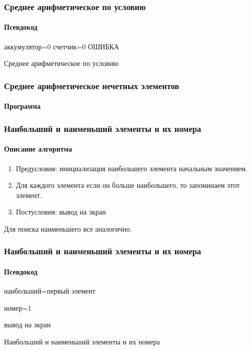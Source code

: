 \begin{frame}[fragile]
\frametitle{Среднее арифметическое по условию}
\framesubtitle{Псевдокод}
\small
\begin{algorithm}[H]
		\SetAlgoLined
		аккумулятор=0\;
		счетчик=0\;
	{ОШИБКА}
	
	\caption{Среднее арифметическое по условию}
\end{algorithm}


\end{frame}


\begin{frame}[fragile]
\frametitle{Среднее арифметическое нечетных элементов}
\framesubtitle{Программа}



\end{frame}


\begin{frame}[fragile]
\frametitle{Наибольший и наименьший элементы и их номера}
\framesubtitle{Описание алгоритма}
\begin{enumerate}
	\item Предусловия: инициализация наибольшего элемента начальным значением.
	\item Для каждого элемента если он больше наибольшего, то запоминаем этот элемент.
	\item Постусловия: вывод на экран
	
\end{enumerate}

Для поиска наименьшего все аналогично.

\end{frame}

\begin{frame}[fragile]
\frametitle{Наибольший и наименьший элементы и их номера}
\framesubtitle{Псевдокод}
\small
\begin{algorithm}[H]
		\SetAlgoLined
		наибольший=первый элемент\;
		
		номер=1\;
		
	
	вывод на экран\;
	\caption{Наибольший и наименьший элементы и их номера}
\end{algorithm}


\end{frame}


